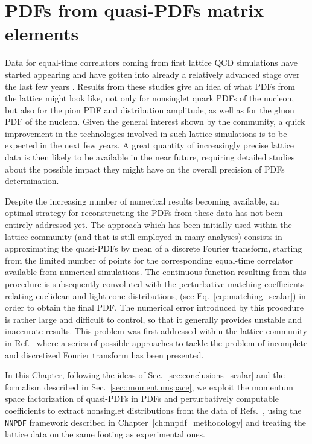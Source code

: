 \chapter{PDFs from quasi-PDFs matrix elements}
\label{ch:qpdfNNPDF}
Data for equal-time correlators coming from first lattice QCD simulations
have started appearing and have gotten into already a relatively advanced stage over the last few years
\cite{Lin:2014zya,Alexandrou:2015rja,Chen:2016utp,Alexandrou:2016jqi,Zhang:2017bzy,Alexandrou:2017huk,Lin:2017ani,Chen:2017gck,Alexandrou:2018pbm,Chen:2018xof,Chen:2018fwa,Alexandrou:2018eet,Liu:2018uuj,Lin:2018qky,Fan:2018dxu,Liu:2018hxv,Alexandrou:2019lfo,Izubuchi:2019lyk}.
Results from these studies give an idea of what PDFs from the lattice might look like, not only for
nonsinglet quark PDFs of the nucleon, but also for the pion PDF and distribution
amplitude, as well as for the gluon PDF of the nucleon. Given the general
interest shown by the community, a quick improvement in the technologies
involved in such lattice simulations is to be expected in the next few years. A
great quantity of increasingly precise lattice data is then likely to be
available in the near future, requiring detailed studies about the possible
impact they might have on the overall precision of PDFs determination.

Despite the increasing number of numerical results becoming available, an
optimal strategy for reconstructing the PDFs from these data has not been
entirely addressed yet. The approach which has been initially used within the lattice community
(and that is still employed in many analyses)
consists in approximating the quasi-PDFs by mean of a discrete Fourier transform,
starting from the limited number of points for the corresponding equal-time correlator available from numerical simulations. 
The continuous function resulting from this procedure
is subsequently convoluted with the perturbative matching coefficients relating euclidean and light-cone distributions,
(see Eq.~\eqref{eq::matching_scalar}) in order to obtain the final PDF.
The numerical error introduced by this procedure is rather large and difficult to control,
so that it generally provides unstable and inaccurate results.
This problem was first addressed within the lattice community in Ref.~\cite{Karpie2019}
where a series of possible approaches to tackle the problem of incomplete and discretized Fourier
transform has been presented.

In this Chapter, following the ideas of Sec.~\ref{sec:conclusions_scalar}
and the formalism described in Sec.~\ref{sec::momentumspace}, we exploit the momentum space factorization
of quasi-PDFs in PDFs and perturbatively computable coefficients to extract nonsinglet distributions from the data of
Refs.~\cite{Alexandrou:2018pbm,Alexandrou:2019lfo}, using the {\tt NNPDF} framework described
in Chapter~\ref{ch:nnpdf_methodology} and treating the lattice data on the same footing as experimental ones.

